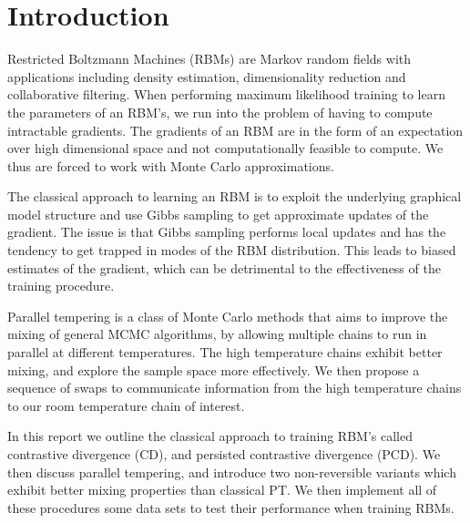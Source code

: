 \section{Introduction}
Restricted Boltzmann Machines (RBMs) are Markov random fields with applications including density estimation, dimensionality reduction and collaborative filtering. When performing maximum likelihood training to learn the parameters of an RBM's, we run into the problem of having to compute intractable gradients. The gradients of an RBM are in the form of an expectation over high dimensional space and not computationally feasible to compute. We thus are forced to work with Monte Carlo approximations. 

The classical approach to learning an RBM is to exploit the underlying graphical model structure and use Gibbs sampling to get approximate updates of the gradient. The issue is that Gibbs sampling performs local updates and has the tendency to get trapped in modes of the RBM distribution. This leads to biased estimates of the gradient, which can be detrimental to the effectiveness of the training procedure.

Parallel tempering is a class of Monte Carlo methods that aims to improve the mixing of general MCMC algorithms, by allowing multiple chains to run in parallel at different temperatures. The high temperature chains exhibit better mixing, and explore the sample space more effectively. We then propose a sequence of swaps to communicate information from the high temperature chains to our room temperature chain of interest. 

In this report we outline the classical approach to training RBM's called contrastive divergence (CD), and persisted contrastive divergence (PCD). We then discuss parallel tempering, and introduce two non-reversible variants which exhibit better mixing properties than classical PT. We then implement all of these procedures some data sets to test their performance when training RBMs.
